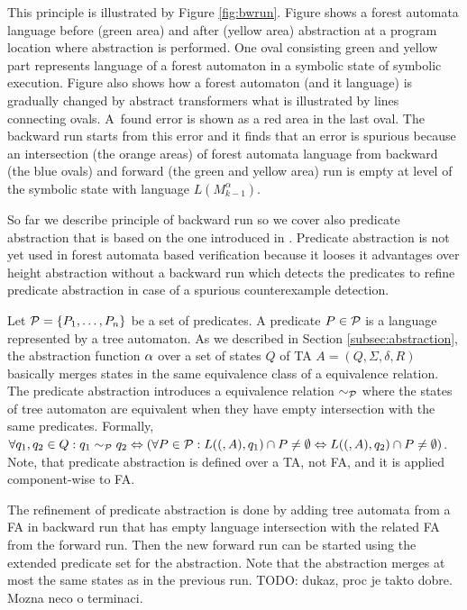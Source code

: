 This principle is illustrated by Figure \ref{fig:bwrun}.
Figure shows a forest automata language before (green area)
and after (yellow area) abstraction at a program location where abstraction is performed.
One oval consisting green and yellow part represents language of a forest automaton
in a symbolic state of symbolic execution.
Figure also shows how a forest automaton (and it language) is gradually changed
by abstract transformers what is illustrated by lines connecting ovals.
A~found error is shown as a red area in the last oval.
The backward run starts from this error and it finds
that an error is spurious because an intersection (the orange areas) of
forest automata language from backward (the blue ovals) and forward
(the green and yellow area) run is empty at level of the symbolic state
with language $L(M^{\alpha}_{k-1})$.

So far we describe principle of backward run so we cover
also predicate abstraction that is based on the one introduced
in \cite{artmc}.
Predicate abstraction is not yet used in forest automata based verification
because it looses it advantages over height abstraction without
a backward run which detects the predicates to refine predicate abstraction
in case of a spurious counterexample detection.

Let $\mathcal{P}=\{P_1, \ldots, P_n\}$ be a set of predicates.
A predicate $P \in \mathcal{P}$ is a language represented by
a tree automaton.
As we described in Section \ref{subsec:abstraction}, the abstraction function $\alpha$
over a set of states $Q$ of TA $A=(Q,\Sigma,\delta, R)$ basically
merges states in the same equivalence class of a equivalence relation.
The predicate abstraction introduces a equivalence relation $\sim_{\mathcal{P}}$
where the states of tree automaton are equivalent when
they have empty intersection with the same predicates.
Formally, $\forall q_1,q_2 \in Q: q_1 \sim_{\mathcal{P}} q_2 \Leftrightarrow
(\forall P \in \mathcal{P}: L((,A),q_1) \cap P \neq \emptyset
\Leftrightarrow L((,A), q_2) \cap P \neq \emptyset)$.
Note, that predicate abstraction is defined over a TA, not FA,
and it is applied component-wise to FA.

The refinement of predicate abstraction is done by adding
tree automata from a FA in backward run that has empty language
intersection with the related FA from the forward run.
Then the new forward run can be started using the extended predicate
set for the abstraction.
Note that the abstraction merges at most the same states as
in the previous run.
TODO: dukaz, proc je takto dobre.
Mozna neco o terminaci.

